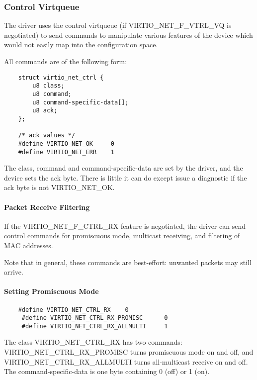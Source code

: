 \subsubsection{Control Virtqueue}\label{sec:Device Types / Network Device / Device Operation / Control Virtqueue}

The driver uses the control virtqueue (if VIRTIO_NET_F_VTRL_VQ is
negotiated) to send commands to manipulate various features of
the device which would not easily map into the configuration
space.

All commands are of the following form:

\begin{lstlisting}
	struct virtio_net_ctrl {
		u8 class;
		u8 command;
		u8 command-specific-data[];
		u8 ack;
	};

	/* ack values */
	#define VIRTIO_NET_OK     0
	#define VIRTIO_NET_ERR    1
\end{lstlisting}

The class, command and command-specific-data are set by the
driver, and the device sets the ack byte. There is little it can
do except issue a diagnostic if the ack byte is not
VIRTIO_NET_OK.

\paragraph{Packet Receive Filtering}\label{sec:Device Types / Network Device / Device Operation / Control Virtqueue / Packet Receive Filtering}

If the VIRTIO_NET_F_CTRL_RX feature is negotiated, the driver can
send control commands for promiscuous mode, multicast receiving,
and filtering of MAC addresses.

Note that in general, these commands are best-effort: unwanted
packets may still arrive.

\paragraph{Setting Promiscuous Mode}\label{sec:Device Types / Network Device / Device Operation / Control Virtqueue / Setting Promiscuous Mode}

\begin{lstlisting}
	#define VIRTIO_NET_CTRL_RX    0
	 #define VIRTIO_NET_CTRL_RX_PROMISC      0
	 #define VIRTIO_NET_CTRL_RX_ALLMULTI     1
\end{lstlisting}

The class VIRTIO_NET_CTRL_RX has two commands:
VIRTIO_NET_CTRL_RX_PROMISC turns promiscuous mode on and off, and
VIRTIO_NET_CTRL_RX_ALLMULTI turns all-multicast receive on and
off. The command-specific-data is one byte containing 0 (off) or
1 (on).

